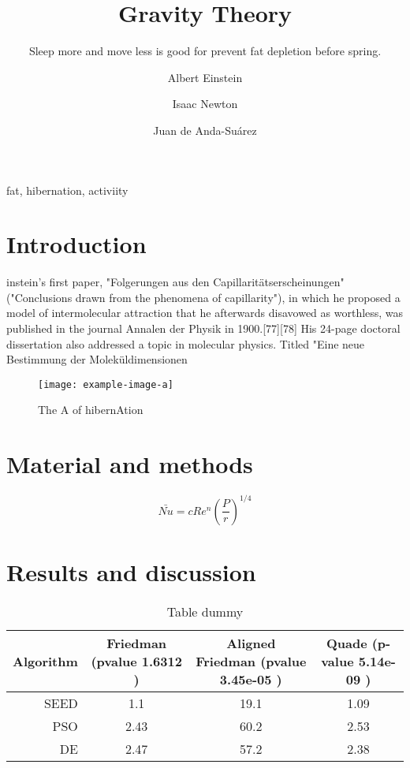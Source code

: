 \documentclass{SFEE}
\begin{document}

\title{Gravity Theory}
\subtitle{Sleep more and move less is good for prevent fat depletion before   spring.}
\author[1,*]{Albert Einstein }
\author[2]{Isaac Newton}
\author[3]{Juan de Anda-Suárez }
\maketitle
\begin{abstract}
    \lipsum[5]
\end{abstract}
\begin{keywords}
    fat, hibernation, activiity
\end{keywords}

\section{Introduction}

instein's first paper, "Folgerungen aus den Capillaritätserscheinungen" ("Conclusions drawn from the phenomena of capillarity"), in which he proposed a model of intermolecular attraction that he afterwards disavowed as worthless, was published in the journal Annalen der Physik in 1900.[77][78] His 24-page doctoral dissertation also addressed a topic in molecular physics. Titled "Eine neue Bestimmung der Moleküldimensionen \cite{1908JRE.....4..411E}

\begin{figure}[b!]
\texttt{[image: example-image-a]}
\caption{The A of hibernAtion}
\end{figure}
\lipsum[10-13]
\section{Material and methods}
\lipsum[14-17]
\begin{equation}
 \bar{Nu}=cRe^{n}\left ( \frac{P}{r} \right )^{1/4}
\end{equation}
\section{Results and discussion}
\lipsum[18-25]
\begin{table*}[htb]
     \caption{Table dummy}
    \footnotesize
    \center
    \begin{tabular}{rccc}
    \hline \hline
    Algorithm & Friedman (pvalue 1.6312 ) & Aligned Friedman  (pvalue 3.45e-05 ) & Quade (p-value 5.14e-09 )  \\
    \hline
     SEED & 1.1  & 19.1 & 1.09   \\
     \hline
     PSO  & 2.43 & 60.2 & 2.53   \\
     \hline
     DE   & 2.47 & 57.2 & 2.38  \\
    \hline

    \hline \hline
    \end{tabular}
  
    \end{table*}
\end{document}
